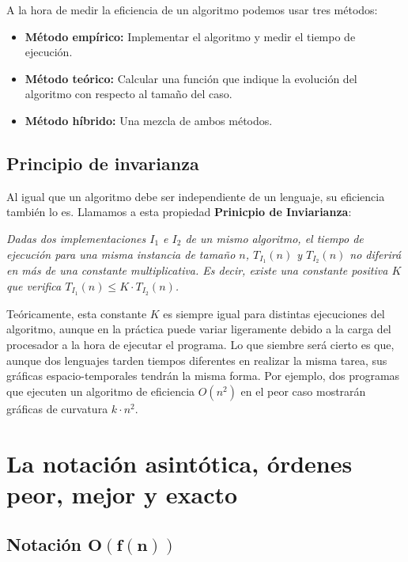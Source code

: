 A la hora de medir la eficiencia de un algoritmo podemos usar tres métodos:

\begin{itemize}
	\item\textbf{Método empírico:} Implementar el algoritmo y medir el tiempo de ejecución.
	\item\textbf{Método teórico:} Calcular una función que indique la evolución del algoritmo con respecto al tamaño del caso.
	\item\textbf{Método híbrido:} Una mezcla de ambos métodos.
\end{itemize}

\subsection{Principio de invarianza}

Al igual que un algoritmo debe ser independiente de un lenguaje, su eficiencia también lo es.
Llamamos a esta propiedad \textbf{Prinicpio de Inviarianza}:

\begin{displayquote}
\textit{Dadas dos implementaciones $I_1$ e $I_2$ de un mismo algoritmo, el tiempo de ejecución para una misma instancia de tamaño $n$, $T_{I_1}(n)$ y $T_{I_2}(n)$ no diferirá en más de una constante multiplicativa. Es decir, existe una constante positiva $K$ que verifica $T_{I_1}(n)\leq K\cdot T_{I_2}(n)$.}
\end{displayquote}

Teóricamente, esta constante $K$ es siempre igual para distintas ejecuciones del algoritmo, aunque en la práctica puede variar ligeramente debido a la carga del procesador a la hora de ejecutar el programa.
Lo que siembre será cierto es que, aunque dos lenguajes tarden tiempos diferentes en realizar la misma tarea, sus gráficas espacio-temporales tendrán la misma forma.
Por ejemplo, dos programas que ejecuten un algoritmo de eficiencia $O(n^2)$ en el peor caso mostrarán gráficas de curvatura $k\cdot n^2$.

\section{La notación asintótica, órdenes peor, mejor y exacto}

\subsection{Notación $\boldsymbol{O(f(n))}$}

